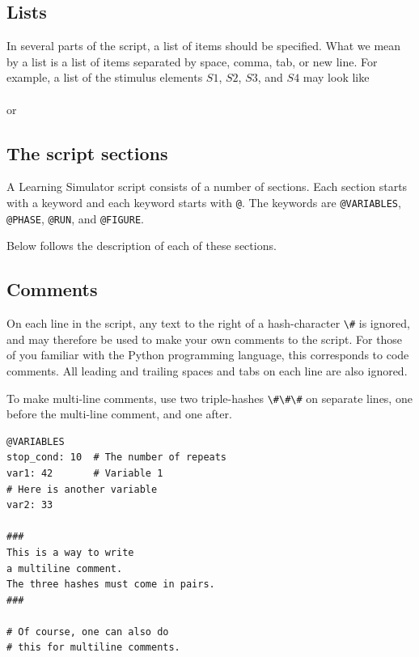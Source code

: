 \documentclass[11pt]{article}
\newcommand{\scr}[1]{\lstinline|#1|}
\begin{document}
\subsection{Lists}
In several parts of the script, a list of items should be specified. What we mean by a list is a list of items separated by space, comma, tab, or new line. For example, a list of the stimulus elements $S1$, $S2$, $S3$, and $S4$ may look like
\\
\fbox{
\begin{minipage}{12.3cm}
\scr{S1, S2, S3, S4}
\end{minipage}}
\\
or 
\\
\fbox{
\begin{minipage}{12.3cm}
	\scr{S1  S2,  S3} \\
	\scr{S4}
\end{minipage}}

\subsection{The script sections}
A Learning Simulator script consists of a number of sections. Each section starts with a keyword and each keyword starts with \scr{@}. The keywords are
\scr{@VARIABLES},
\scr{@PHASE},
\scr{@RUN}, and
\scr{@FIGURE}.


Below follows the description of each of these sections. 

\subsection{Comments}
On each line in the script, any text to the right of a hash-character \scr{\#} is ignored, and may therefore be used to make your own comments to the script. For those of you familiar with the Python programming language, this corresponds to code comments.
All leading and trailing spaces and tabs on each line are also ignored.

To make multi-line comments, use two triple-hashes \scr{\#\#\#} on separate lines, one before the multi-line comment, and one after.
\begin{lstlisting}[caption={Script comments}]
@VARIABLES
stop_cond: 10  # The number of repeats
var1: 42       # Variable 1
# Here is another variable
var2: 33

###
This is a way to write
a multiline comment.
The three hashes must come in pairs.
###

# Of course, one can also do
# this for multiline comments.
\end{lstlisting}
\end{document}

